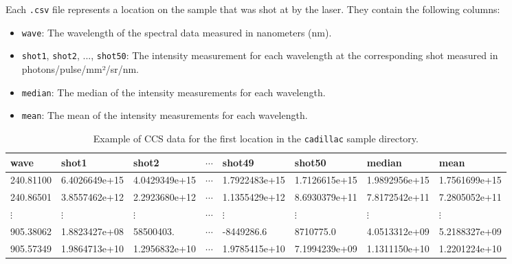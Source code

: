 Each \texttt{.csv} file represents a location on the sample that was shot at by the laser.
They contain the following columns:

\begin{itemize}
    \item \texttt{wave}: The wavelength of the spectral data measured in nanometers (nm).
    \item \texttt{shot1}, \texttt{shot2}, ..., \texttt{shot50}: The intensity measurement for each wavelength at the corresponding shot measured in photons/pulse/mm²/sr/nm.
    \item \texttt{median}: The median of the intensity measurements for each wavelength.
    \item \texttt{mean}: The mean of the intensity measurements for each wavelength.
\end{itemize}

\begin{table}[!b]
\centering
\begin{tabular}{llllllll}
\toprule
     wave &         shot1 &         shot2 &  $\cdots$ &        shot49 &       shot50  & median        & mean          \\
\midrule
240.81100 & 6.4026649e+15 & 4.0429349e+15 & $\cdots$  & 1.7922483e+15 & 1.7126615e+15 & 1.9892956e+15 & 1.7561699e+15 \\
240.86501 & 3.8557462e+12 & 2.2923680e+12 & $\cdots$  & 1.1355429e+12 & 8.6930379e+11 & 7.8172542e+11 & 7.2805052e+11 \\
$\vdots$  & $\vdots$      & $\vdots$      & $\cdots$  & $\vdots$      & $\vdots$      & $\vdots$      & $\vdots$      \\
905.38062 & 1.8823427e+08 & 58500403.     & $\cdots$  & -8449286.6    & 8710775.0     & 4.0513312e+09 & 5.2188327e+09 \\
905.57349 & 1.9864713e+10 & 1.2956832e+10 & $\cdots$  & 1.9785415e+10 & 7.1994239e+09 & 1.1311150e+10 & 1.2201224e+10 \\
\bottomrule
\end{tabular}
\caption{Example of CCS data for the first location in the \texttt{cadillac} sample directory.}
\label{tab:ccs_data_example}
\end{table}

